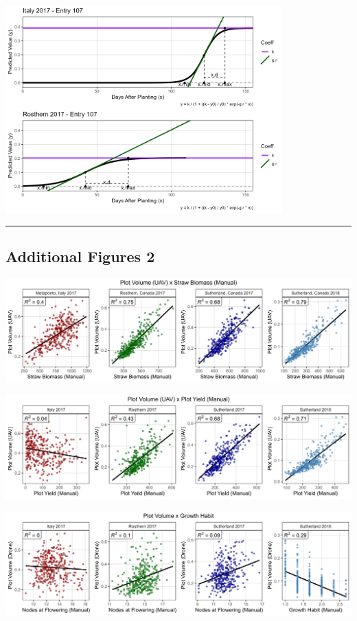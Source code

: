 \documentclass[
]{article}
\begin{document}
\includegraphics[width=0.8\textwidth,height=\textheight]{Additional/Additional_Figure_01_3.png}

\begin{center}\rule{0.5\linewidth}{0.5pt}\end{center}

\pagebreak

\subsection{Additional Figures 2}\label{additional-figures-2}

\includegraphics{Additional/Additional_Figure_02_1.png}

\includegraphics{Additional/Additional_Figure_02_2.png}

\includegraphics{Additional/Additional_Figure_02_3.png}
\end{document}
